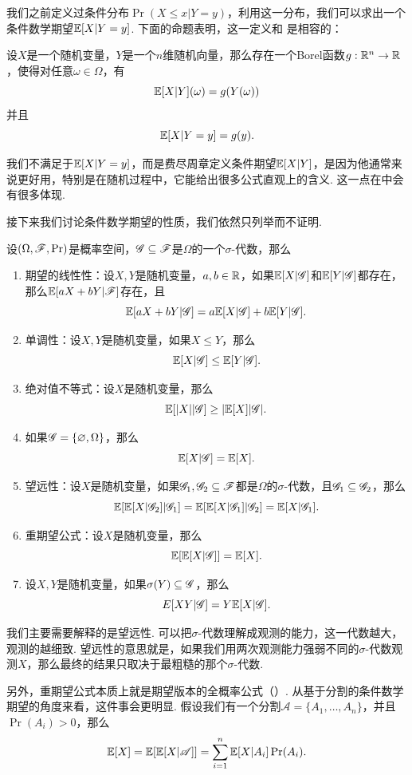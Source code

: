我们之前定义过条件分布$\Pr(X\leq x|Y=y)$，利用这一分布，我们可以求出一个条件数学期望$\mathbb{E}[X|Y=y]$. 下面的命题表明，这一定义和 是相容的：

\begin{proposition}\label{proposition:conditional-expectation-vector}
    设$X$是一个随机变量，$Y$是一个$n$维随机向量，那么存在一个Borel函数$g:\mathbb{R}^n\to\mathbb{R}$，使得对任意$\omega\in\Omega$，有
    \[\mathbb{E}[X|Y](\omega)=g(Y(\omega))\]
    并且
    \[\mathbb{E}[X|Y=y]=g(y).\]
\end{proposition}

我们不满足于$\mathbb{E}[X|Y=y]$，而是费尽周章定义条件期望$\mathbb{E}[X|Y]$，是因为他通常来说更好用，特别是在随机过程中，它能给出很多公式直观上的含义. 这一点在中会有很多体现. 

接下来我们讨论条件数学期望的性质，我们依然只列举而不证明. 

\begin{proposition}\label{proposition:conditional-expectation-basic}
设$(\Omega,\mathscr{F},\Pr)$是概率空间，$\mathscr{G}\subseteq\mathscr{F}$是$\Omega$的一个$\sigma$-代数，那么
\begin{enumerate}
\item 期望的线性性：设$X,Y$是随机变量，$a,b\in\mathbb{R}$，如果$\mathbb{E}[X|\mathscr{G}]$和$\mathbb{E}[Y|\mathscr{G}]$都存在，那么$\mathbb{E}[aX+bY|\mathscr{F}]$存在，且
\[\mathbb{E}[aX+bY|\mathscr{G}]=a\mathbb{E}[X|\mathscr{G}]+b\mathbb{E}[Y|\mathscr{G}].\]
\item 单调性：设$X,Y$是随机变量，如果$X\leq Y$，那么
\[\mathbb{E}[X|\mathscr{G}]\leq \mathbb{E}[Y|\mathscr{G}].\]
\item 绝对值不等式：设$X$是随机变量，那么
\[\mathbb{E}[|X||\mathscr{G}]\geq |\mathbb{E}[X]|\mathscr{G}|.\]
\item 如果$\mathscr{G}=\{\varnothing,\Omega\}$，那么
\[\mathbb{E}[X|\mathscr{G}]=\mathbb{E}[X].\]
\item 望远性：设$X$是随机变量，如果$\mathscr{G}_1,\mathscr{G}_2\subseteq\mathscr{F}$都是$\Omega$的$\sigma$-代数，且$\mathscr{G}_1\subseteq\mathscr{G}_2$，那么
\[\mathbb{E}[\mathbb{E}[X|\mathscr{G}_2]|\mathscr{G}_1]=\mathbb{E}[\mathbb{E}[X|\mathscr{G}_1]|\mathscr{G}_2]=\mathbb{E}[X|\mathscr{G}_1].\]
\item 重期望公式：设$X$是随机变量，那么
\[\mathbb{E}[\mathbb{E}[X|\mathscr{G}]]=\mathbb{E}[X].\]
\item 设$X,Y$是随机变量，如果$\sigma(Y)\subseteq\mathscr{G}$，那么
\[E[XY|\mathscr{G}]=Y\mathbb{E}[X|\mathscr{G}].\]
\end{enumerate}
\end{proposition}

我们主要需要解释的是望远性. 可以把$\sigma$-代数理解成观测的能力，这一代数越大，观测的越细致. 望远性的意思就是，如果我们用两次观测能力强弱不同的$\sigma$-代数观测$X$，那么最终的结果只取决于最粗糙的那个$\sigma$-代数. 

另外，重期望公式本质上就是期望版本的全概率公式（）. 从基于分割的条件数学期望的角度来看，这件事会更明显. 假设我们有一个分割$\mathscr{A}=\{A_1,\dots,A_n\}$，并且$\Pr(A_i)>0$，那么
\[\mathbb{E}[X]=\mathbb{E}[\mathbb{E}[X|\mathscr{A}]]=\sum_{i=1}^n \mathbb{E}[X|A_i]\Pr(A_i).\]

